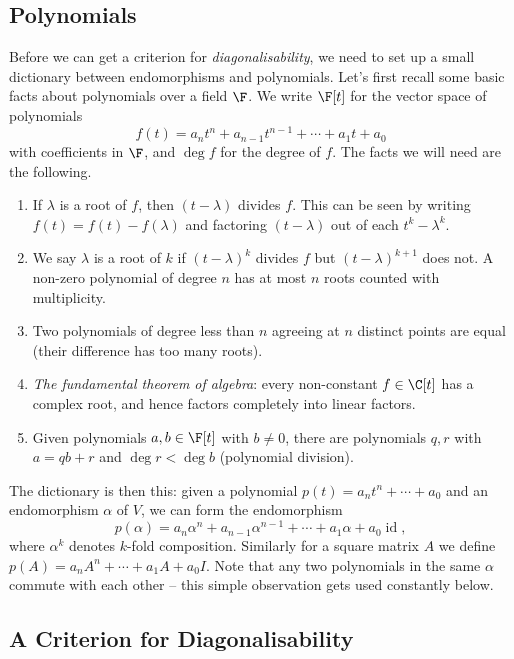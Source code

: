 \subsection{Polynomials}

Before we can get a criterion for \emph{diagonalisability}, we need to set up a small dictionary between endomorphisms and polynomials. Let's first recall some basic facts about polynomials over a field $\F$. We write $\F[t]$ for the vector space of polynomials
$$
f(t) = a_n t^n + a_{n - 1}t^{n - 1} + \cdots + a_1 t + a_0
$$
with coefficients in $\F$, and $\deg f$ for the degree of $f$. The facts we will need are the following.
\begin{enumerate}[label=(\roman*)]
    \item If $\lambda$ is a root of $f$, then $(t - \lambda)$ divides $f$. This can be seen by writing $f(t) = f(t) - f(\lambda)$ and factoring $(t - \lambda)$ out of each $t^k - \lambda^k$.
    \item We say $\lambda$ is a root of  $k$ if $(t - \lambda)^k$ divides $f$ but $(t - \lambda)^{k + 1}$ does not. A non-zero polynomial of degree $n$ has at most $n$ roots counted with multiplicity.
    \item Two polynomials of degree less than $n$ agreeing at $n$ distinct points are equal (their difference has too many roots).
    \item \emph{The fundamental theorem of algebra}: every non-constant $f \in \C[t]$ has a complex root, and hence factors completely into linear factors.
    \item Given polynomials $a, b \in \F[t]$ with $b \neq 0$, there are polynomials $q, r$ with $a = qb + r$ and $\deg r < \deg b$ (polynomial division).
\end{enumerate}

The dictionary is then this: given a polynomial $p(t) = a_n t^n + \cdots + a_0$ and an endomorphism $\alpha$ of $V$, we can form the endomorphism
$$
p(\alpha) = a_n \alpha^n + a_{n-1}\alpha^{n - 1} + \cdots + a_1 \alpha + a_0 \operatorname{id},
$$
where $\alpha^k$ denotes $k$-fold composition. Similarly for a square matrix $A$ we define $p(A) = a_n A^n + \cdots + a_1 A + a_0 I$. Note that any two polynomials in the same $\alpha$ commute with each other -- this simple observation gets used constantly below.

\subsection{A Criterion for Diagonalisability}

